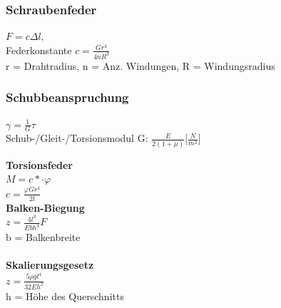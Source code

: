 \begin{multicols}{2}
\subsubsection{Schraubenfeder}
$F = c \Delta l, \;$ \\
Federkonstante $c = \frac{Gr^4}{4nR^3}$ \\
r = Drahtradius, n = Anz. Windungen, R = Windungsradius

\subsubsection{Schubbeanspruchung}
$\gamma = \frac{1}{G}\tau$ \\
Schub-/Gleit-/Torsionsmodul G: $\frac{E}{2(1+\mu)} \lbrack \frac{N}{m^2} \rbrack$
\end{multicols}

\begin{multicols}{3}
\textbf{Torsionsfeder} \\
$M = c* \cdot \varphi$ \\
$c = \frac{\varphi G r^4}{2l} $
\columnbreak
\\
\textbf{Balken-Biegung} \\
$z = \frac{4l^3}{Ebh^3}F$ \\
b = Balkenbreite \\
\columnbreak
\\
\textbf{Skalierungsgesetz} \\
$z = \frac{5 \rho g l^4}{32Eh^2}$ \\
h = Höhe des Querschnitts
\end{multicols}



